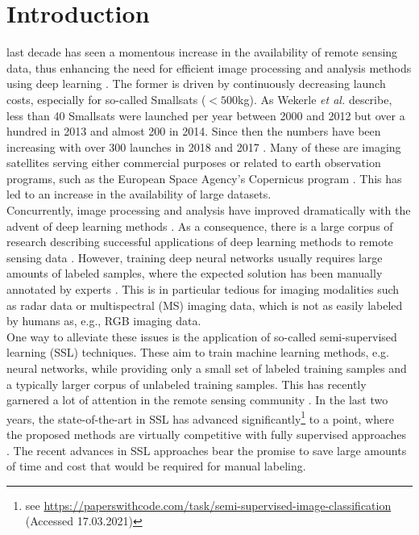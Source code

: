 \documentclass[journal]{IEEEtran}
\newcommand{\etal}{\textit{et al.}}
\begin{document}
\begingroup\renewcommand\thefootnote{*}
\endgroup

\IEEEpeerreviewmaketitle

\section{Introduction}
 last decade has seen a momentous increase in the availability of remote sensing data, thus enhancing the need for efficient image processing and analysis methods using deep learning \cite{zhu2017}. The former is driven by continuously decreasing launch costs, especially for so-called Smallsats ($< 500$kg). As Wekerle \etal{} \cite{wekerle2017} describe, less than 40 Smallsats were launched per year between 2000 and 2012 but over a hundred in 2013 and almost 200 in 2014. Since then the numbers have been increasing with over 300 launches in 2018 and 2017 \cite{puteaux2019}. Many of these are imaging satellites serving either commercial purposes \cite{popkin2017} or related to earth observation programs, such as the European Space Agency's Copernicus program \cite{aschbacher2017,wekerle2017}. This has led to an increase in the availability of large datasets. \\
Concurrently, image processing and analysis have improved dramatically with the advent of deep learning methods \cite{alom2018}. As a consequence, there is a large corpus of research describing successful applications of deep learning methods to remote sensing data \cite{ball2017,chen2016,ma2019,zhang2016,zhu2017}. However, training deep neural networks usually requires large amounts of labeled samples, where the expected solution has been manually annotated by experts \cite{chen2017hyperspectral}. This is in particular tedious for imaging modalities such as radar data or multispectral (MS) imaging data, which is not as easily labeled by humans as, e.g., RGB imaging data. \\
One way to alleviate these issues is the application of so-called semi-supervised learning (SSL) techniques. These aim to train machine learning methods, e.g. neural networks, while providing only a small set of labeled training samples and a typically larger corpus of unlabeled training samples. This has recently garnered a lot of attention in the remote sensing community \cite{liu2017,wu2017,zhang2020,roy2018,tao2020}. In the last two years, the state-of-the-art in SSL has advanced significantly\footnote{see \url{ https://paperswithcode.com/task/semi-supervised-image-classification} (Accessed 17.03.2021)} to a point, where the proposed methods are virtually competitive with fully supervised approaches \cite{berthelot2019,berthelot2019remixmatch,kurakin2020}. The recent advances in SSL approaches bear the promise to save large amounts of time and cost that would be required for manual labeling. \\
\end{document}
